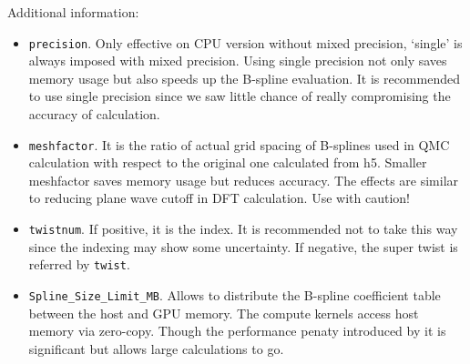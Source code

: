 Additional information:
\begin{itemize}
\item \texttt{precision}. Only effective on CPU version without mixed precision, `single' is always imposed with mixed precision. Using single precision not only saves memory usage but also speeds up the B-spline evaluation. It is recommended to use single precision since we saw little chance of really compromising the accuracy of calculation.
\item \texttt{meshfactor}. It is the ratio of actual grid spacing of B-splines used in QMC calculation with respect to the original one calculated from h5. Smaller meshfactor saves memory usage but reduces accuracy. The effects are similar to reducing plane wave cutoff in DFT calculation. Use with caution! 
\item \texttt{twistnum}. If positive, it is the index. It is recommended not to take this way since the indexing may show some uncertainty. If negative, the super twist is referred by \texttt{twist}.
\item \texttt{Spline\_Size\_Limit\_MB}. Allows to distribute the B-spline coefficient table between the host and GPU memory. The compute kernels access host memory via zero-copy. Though the performance penaty introduced by it is significant but allows large calculations to go.
\end{itemize}
